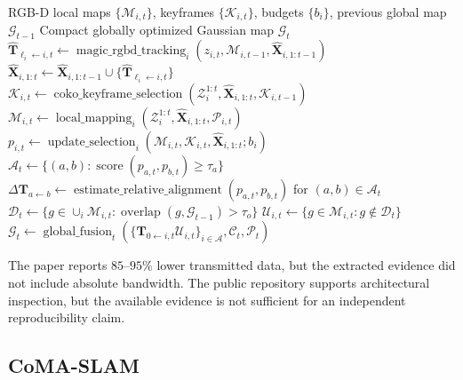 \documentclass[11pt, a4paper, logo]{googledeepmind}
\begin{document}
\begin{algorithm}[H]
\caption{CoKo-SLAM}
\label{alg:coko-slam}
\small
\begin{algorithmic}[1]
  \Require RGB-D local maps $\{\mathcal{M}_{i,t}\}$, keyframes $\{\mathcal{K}_{i,t}\}$, budgets $\{b_i\}$, previous global map $\mathcal{G}_{t-1}$
  \Ensure Compact globally optimized Gaussian map $\mathcal{G}_t$
  \State $\hat{\mathbf{T}}_{\ell_i\leftarrow i,t} \gets \operatorname{magic\_rgbd\_tracking}_i(z_{i,t},\mathcal{M}_{i,t-1},\hat{\mathbf{X}}_{i,1:t-1})$ 
  \State $\hat{\mathbf{X}}_{i,1:t} \gets \hat{\mathbf{X}}_{i,1:t-1}\cup\{\hat{\mathbf{T}}_{\ell_i\leftarrow i,t}\}$ 
  \State $\mathcal{K}_{i,t} \gets \operatorname{coko\_keyframe\_selection}(\mathcal{Z}_i^{1:t},\hat{\mathbf{X}}_{i,1:t},\mathcal{K}_{i,t-1})$ 
  \State $\mathcal{M}_{i,t} \gets \operatorname{local\_mapping}_i(\mathcal{Z}_i^{1:t},\hat{\mathbf{X}}_{i,1:t},\mathcal{P}_{i,t})$ 
  \State $p_{i,t} \gets \operatorname{update\_selection}_i(\mathcal{M}_{i,t},\mathcal{K}_{i,t},\hat{\mathbf{X}}_{i,1:t};b_i)$ 
  \State $\mathcal{A}_t \gets \{(a,b):\operatorname{score}(p_{a,t},p_{b,t})\geq\tau_a\}$ 
  \State $\Delta\mathbf{T}_{a\leftarrow b} \gets \operatorname{estimate\_relative\_alignment}(p_{a,t},p_{b,t})$ for $(a,b)\in\mathcal{A}_t$ 
  \State $\mathcal{D}_t \gets \{g\in\cup_i\mathcal{M}_{i,t}:\operatorname{overlap}(g,\mathcal{G}_{t-1})>\tau_o\}$ 
  \State $\mathcal{U}_{i,t} \gets \{g\in\mathcal{M}_{i,t}:g\notin\mathcal{D}_t\}$ 
  \State $\mathcal{G}_t \gets \operatorname{global\_fusion}_t(\{\mathbf{T}_{0\leftarrow i,t}\mathcal{U}_{i,t}\}_{i\in\mathcal{A}},\mathcal{C}_t,\mathcal{P}_t)$ 
\end{algorithmic}
\end{algorithm}

The paper reports $85$--$95\%$ lower transmitted data, but the extracted evidence did not include absolute bandwidth. The public repository supports architectural inspection, but the available evidence is not sufficient for an independent reproducibility claim.

\subsection{CoMA-SLAM}
\label{sec:systems:coma-slam}
\end{document}
